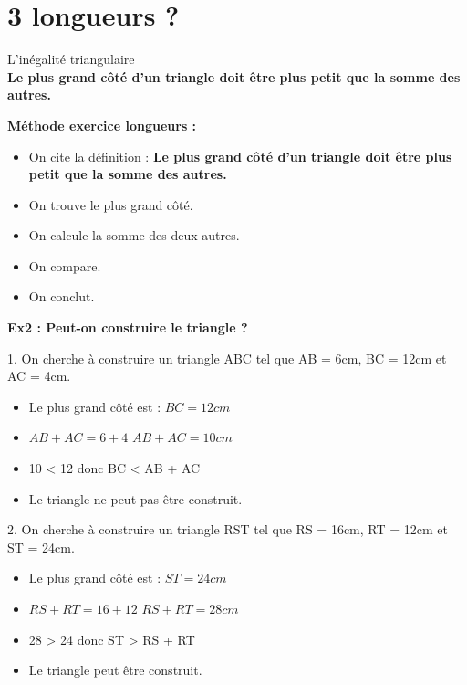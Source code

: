 \section*{3 longueurs ?}

\begin{Definition}{L'inégalité triangulaire}\\
  \textbf{Le plus grand côté d'un triangle doit être plus petit que la somme des autres.}
\end{Definition}

\textbf{Méthode exercice longueurs :}

\begin{itemize}
  \item On cite la définition : \textbf{Le plus grand côté d'un triangle doit être plus petit que la somme des autres.}
  \item On trouve le plus grand côté.
  \item On calcule la somme des deux autres.
  \item On compare.
  \item On conclut. 
\end{itemize}

\horrule{1px}
\textbf{Ex2 : Peut-on construire le triangle ?}

1. On cherche à construire un triangle ABC tel que  AB = 6cm, BC = 12cm et AC = 4cm. 

\begin{itemize}[label={$\bullet$}]
  \item Le plus grand côté est : $BC = 12cm$
  \item $AB + AC = 6 + 4$ \newline
        $AB + AC = 10cm$ 
  \item 10 < 12 donc BC < AB + AC
  \item Le triangle ne peut pas être construit.
\end{itemize}

2. On cherche à construire un triangle RST tel que  RS = 16cm, RT = 12cm et ST = 24cm. 

\begin{itemize}[label={$\bullet$}]
  \item Le plus grand côté est : $ST = 24cm$
  \item $RS + RT = 16 + 12$ \newline
        $RS + RT = 28cm$ 
  \item 28 > 24 donc ST > RS + RT
  \item Le triangle peut être construit.
\end{itemize}



